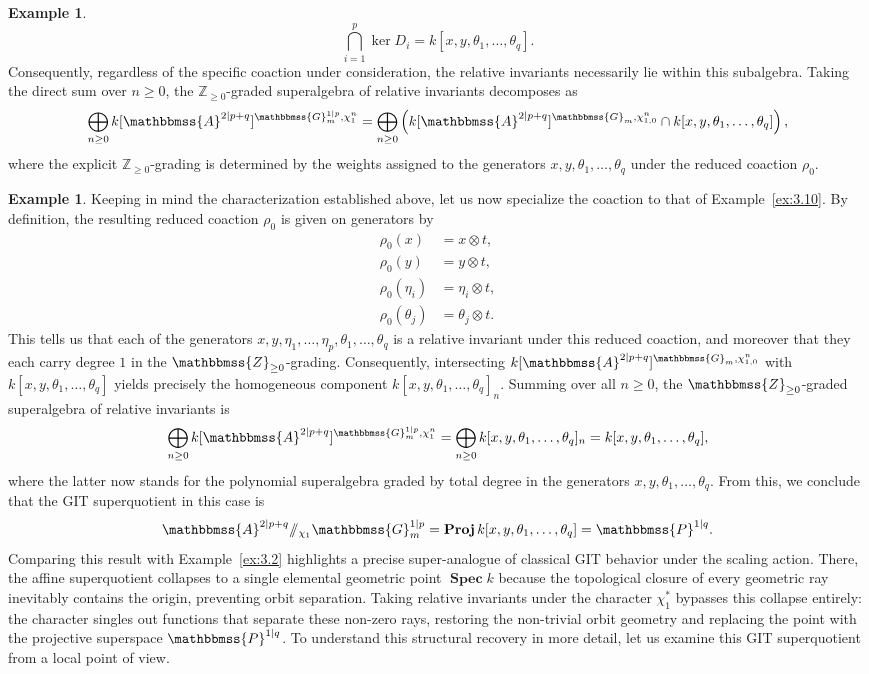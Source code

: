 \documentclass[11pt,a4paper,reqno,noamsfonts]{amsart}
\numberwithin{equation}{section}
\theoremstyle{definition}
\newtheorem{example}[theorem]{Example}
\theoremstyle{remark}
\renewcommand{\AA}{\ensuremath{\mathbbmss{A}}}
\newcommand{\GG}{\ensuremath{\mathbbmss{G}}}
\newcommand{\PP}{\ensuremath{\mathbbmss{P}}}
\newcommand{\ZZ}{\ensuremath{\mathbbmss{Z}}}
\DeclareMathOperator{\sSpec}{\mathbf{Spec}}
\DeclareMathOperator{\sProj}{\mathbf{Proj}}
\begin{document}
\begin{example}
$$
\bigcap_{i=1}^{p} \ker D_i = k[x,y,\theta_1,\dots,\theta_q].
$$
Consequently, regardless of the specific coaction under consideration, the relative invariants necessarily lie within this subalgebra. Taking the direct sum over $n \ge 0$, the $\mathbb{Z}_{\ge 0}$-graded superalgebra of relative invariants decomposes as
$$
\bigoplus_{n \ge 0} k[\AA^{2 \vert p+q}]^{\GG_m^{1\vert p}, \chi_1^n} = \bigoplus_{n \ge 0} \left( k[\AA^{2 \vert p+q}]^{\GG_m, \chi_{1,0}^n} \cap k[x,y,\theta_1,\dots,\theta_q] \right),
$$
where the explicit $\mathbb{Z}_{\ge 0}$-grading is determined by the weights assigned to the generators $x, y, \theta_1, \dots, \theta_q$ under the reduced coaction $\rho_0$.
\end{example}

\begin{example}\label{ex:4.15}
Keeping in mind the characterization established above, let us now specialize the coaction to that of Example~\ref{ex:3.10}. By definition, the resulting reduced coaction $\rho_0$ is given on generators by
$$
\begin{aligned} 
 \rho_0 (x) &= x \otimes t, \\ 
 \rho_0 (y) &= y \otimes t, \\  
 \rho_0 (\eta_i) &= \eta_i \otimes t, \\ 
 \rho_0 (\theta_j) &= \theta_j \otimes t. 
 \end{aligned}
 $$
This tells us that each of the generators $x, y, \eta_1,\dots,\eta_p, \theta_1,\dots,\theta_q$ is a relative invariant under this reduced coaction, and moreover that they each carry degree $1$ in the $\ZZ_{\ge 0}$-grading. Consequently, intersecting $k[\AA^{2 \vert p+q}]^{\GG_m, \chi_{1,0}^n}$ with $k[x,y,\theta_1,\dots,\theta_q]$ yields precisely the homogeneous component $k[x,y,\theta_1,\dots,\theta_q]_n$. Summing over all $n \ge 0$, the $\ZZ_{\ge 0}$-graded superalgebra of relative invariants is
$$
\bigoplus_{n \ge 0} k[\AA^{2 \vert p+q}]^{\GG_m^{1\vert p}, \chi_1^n} = \bigoplus_{n \ge 0} k[x,y,\theta_1,\dots,\theta_q]_n = k[x,y,\theta_1,\dots,\theta_q], 
$$
where the latter now stands for the polynomial superalgebra graded by total degree in the generators $x,y,\theta_1,\dots,\theta_q$. From this, we conclude that the GIT superquotient in this case is
$$
\AA^{2 \vert p+q} {\sslash_{\chi_1}} \GG_m^{1 \vert p} = \sProj k[x,y,\theta_1,\dots,\theta_q] = \PP^{1 \vert q}.
$$
Comparing this result with Example~\ref{ex:3.2} highlights a precise super-analogue of classical GIT behavior under the scaling action. There, the affine superquotient collapses to a single elemental geometric point $\sSpec k$ because the topological closure of every geometric ray inevitably contains the origin, preventing orbit separation. Taking relative invariants under the character $\chi_1^{*}$ bypasses this collapse entirely: the character singles out functions that separate these non-zero rays, restoring the non-trivial orbit geometry and replacing the point with the projective superspace $\PP^{1 \vert q}$. To understand this structural recovery in more detail, let us examine this GIT superquotient from a local point of view.


\end{example}
\end{document}
